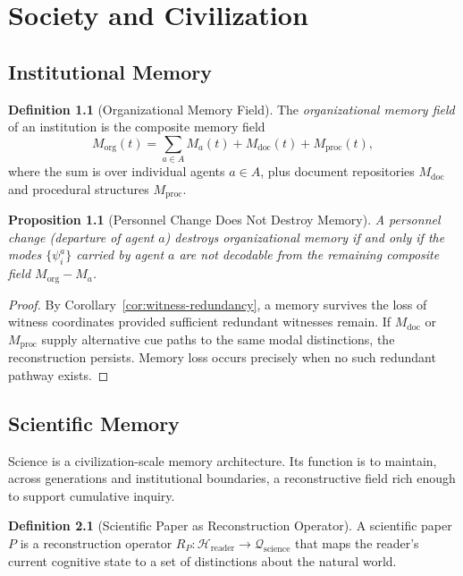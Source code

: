 \documentclass[12pt, oneside]{book}
\theoremstyle{plain}
\newtheorem{proposition}[theorem]{Proposition}
\theoremstyle{definition}
\newtheorem{definition}[theorem]{Definition}
\theoremstyle{remark}
\newcommand{\calH}{\mathcal{H}}
\newcommand{\calQ}{\mathcal{Q}}
\begin{document}
\part{Society and Civilization}

\chapter{Institutional Memory}

\begin{definition}[Organizational Memory Field]
The \emph{organizational memory field} of an institution
is the composite memory field
\[
  M_{\mathrm{org}}(t)
  = \sum_{a \in A} M_a(t) + M_{\mathrm{doc}}(t) + M_{\mathrm{proc}}(t),
\]
where the sum is over individual agents $a \in A$,
plus document repositories $M_{\mathrm{doc}}$ and
procedural structures $M_{\mathrm{proc}}$.
\end{definition}

\begin{proposition}[Personnel Change Does Not Destroy Memory]
A personnel change (departure of agent $a$) destroys
organizational memory if and only if the modes
$\{\psi_i^a\}$ carried by agent $a$ are not
decodable from the remaining composite field
$M_{\mathrm{org}} - M_a$.
\end{proposition}

\begin{proof}
By Corollary~\ref{cor:witness-redundancy},
a memory survives the loss of witness coordinates
provided sufficient redundant witnesses remain.
If $M_{\mathrm{doc}}$ or $M_{\mathrm{proc}}$ supply
alternative cue paths to the same modal distinctions,
the reconstruction persists.
Memory loss occurs precisely when no such redundant
pathway exists.
\end{proof}

\chapter{Scientific Memory}

Science is a civilization-scale memory architecture.
Its function is to maintain, across generations and
institutional boundaries, a reconstructive field
rich enough to support cumulative inquiry.

\begin{definition}[Scientific Paper as Reconstruction Operator]
A scientific paper $P$ is a reconstruction operator
$R_P : \calH_{\mathrm{reader}} \to \calQ_{\mathrm{science}}$
that maps the reader's current cognitive state to a
set of distinctions about the natural world.
\end{definition}
\end{document}
